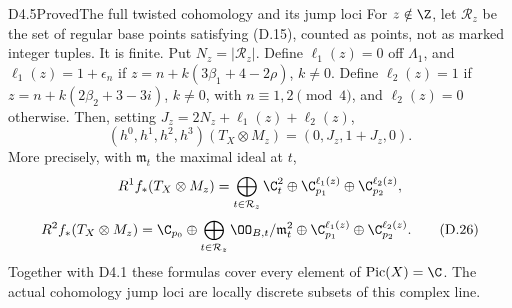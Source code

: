 \begin{claim}{D4.5}{Proved}{The full twisted cohomology and its jump loci}
For $z\notin\Z$, let $\mathcal R_z$ be the set of regular base
points satisfying (D.15), counted as points, not as marked integer
tuples. It is finite. Put $N_z=|\mathcal R_z|$. Define
$\ell_1(z)=0$ off $\Lambda_1$, and
$\ell_1(z)=1+\epsilon_n$ if
$z=n+k(3\beta_1+4-2\rho)$, $k\ne0$.
Define $\ell_2(z)=1$ if
$z=n+k(2\beta_2+3-3i)$, $k\ne0$, with
$n\equiv1,2\pmod4$, and $\ell_2(z)=0$ otherwise.
Then, setting $J_z=2N_z+\ell_1(z)+\ell_2(z)$,
\[
 \boxed{(h^0,h^1,h^2,h^3)(T_X\otimes M_z)=(0,J_z,1+J_z,0).} \tag{D.25}
\]
More precisely, with $\mathfrak m_t$ the maximal ideal at $t$,
\[
 R^1f_*(T_X\otimes M_z)=
   \bigoplus_{t\in\mathcal R_z}\C_t^2
      \oplus\C_{p_1}^{\ell_1(z)}\oplus\C_{p_2}^{\ell_2(z)},
\]
\[
 R^2f_*(T_X\otimes M_z)=\C_{p_0}\oplus
   \bigoplus_{t\in\mathcal R_z}\OO_{B,t}/\mathfrak m_t^2
      \oplus\C_{p_1}^{\ell_1(z)}\oplus\C_{p_2}^{\ell_2(z)}. \tag{D.26}
\]
Together with D4.1 these formulas cover every element of
$\operatorname{Pic}(X)=\C$. The actual cohomology jump loci are
locally discrete subsets of this complex line.
\end{claim}
